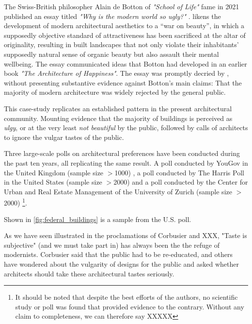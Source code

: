 \documentclass{article}
\begin{document}
\begin{multicols}{2}
    
The Swiss-British philosopher Alain de Botton of \textit{"School of Life"} fame in 2021 published an essay titled \textit{"Why is the modern world so ugly?"} \cite{howarth_why_2021}.  likens the development of modern architectural aesthetics to a “war on beauty”, in which a supposedly objective standard of attractiveness has been sacrificed at the altar of originality, resulting in built landscapes that not only violate their inhabitants’ supposedly natural sense of organic beauty but also assault their mental wellbeing. The essay communicated ideas that Botton had developed in an earlier book \textit{"The Architecture of Happiness"}. The essay was promptly decried by \cite{rogan_trads_2021}, without presenting substantive evidence against Botton's main claims: That the majority of modern architecture was widely rejected by the general public. 

This case-study replicates an established pattern in the present architectural community. Mounting evidence that the majority of buildings is perceived as \textit{ulgy}, or at the very least \textit{not beautiful} by the public, followed by calls of architects to ignore the vulgar tastes of the public. 

Three large-scale polls on architectural preferences have been conducted during the past ten years, all replicating the same result. A poll conducted by YouGov in the United Kingdom (sample size $>$1000) \cite{noauthor_yougov_2009}, a poll conducted by The Harris Poll in the United States (sample size $>$2000) \cite{noauthor_americans_2020} and a poll conducted by the Center for Urban and Real Estate Management of the University of Zurich (sample size $>$2000) \cite{hollenstein_schone_2022} \footnote{It should be noted that despite the best efforts of the authors, no scientific study or poll was found that provided evidence to the contrary. Without any claim to completeness, we can therefore say XXXXX}.

Shown in \cref{fig:federal_buildings} is a sample from the U.S. poll.




As we have seen illustrated in the proclamations of Corbusier and XXX, "Taste is subjective" (and we must take part in) has always been the the refuge of modernists. Corbusier said that the public had to be re-educated, and others have wondered about the vulgarity of designs for the public and asked whether architects should take these architectural tastes seriously.

\end{multicols}
\end{document}
